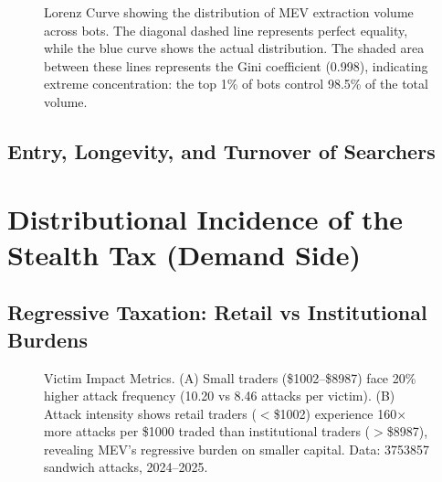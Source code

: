\documentclass[pdflatex, sn-basic]{sn-jnl}
\theoremstyle{thmstylethree}%
\begin{document}
	\begin{figure}[t]
		\centering
		
		\caption{Lorenz Curve showing the distribution of MEV extraction volume across bots.
		The diagonal dashed line represents perfect equality, while the blue curve shows the actual distribution.
		The shaded area between these lines represents the Gini coefficient (\num{0.998}), indicating extreme concentration: the top \num{1}\% of bots control \num{98.5}\% of the total volume.}
		\label{fig:lorenz-curve}
	\end{figure}

	\subsection{Entry, Longevity, and Turnover of Searchers}
	\label{subsec:searcher-dynamics}

	\section{Distributional Incidence of the Stealth Tax (Demand Side)}
	\label{sec:demand-side-incidence}

	\subsection{Regressive Taxation: Retail vs Institutional Burdens}
	\label{subsec:regressive-tax}


	\begin{figure}[t]
		\centering
		
		\caption{Victim Impact Metrics.
    	(A) Small traders (\$\num{1002}--\$\num{8987}) face \num{20}\% higher attack frequency (\num{10.20} vs \num{8.46} attacks per victim).
    	(B) Attack intensity shows retail traders ($<$\$\num{1002}) experience \num{160}$\times$ more attacks per \$\num{1000} traded than institutional traders ($>$\$\num{8987}), revealing MEV's regressive burden on smaller capital.
    	Data: \num{3753857} sandwich attacks, 2024--2025.}
		\label{fig:victim-impact-metrics}
	\end{figure}
\end{document}
